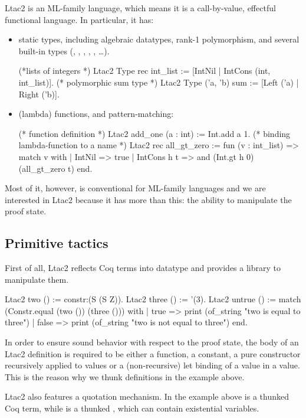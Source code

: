 Ltac2 is an ML-family language, which means it is a call-by-value, effectful functional language.
In particular, it has:
\begin{itemize}
\item static types, including algebraic datatypes, rank-1 polymorphism, and several built-in types (, , , , , \ldots).
  \begin{coq}
  (*lists of integers *)
  Ltac2 Type rec int_list := [IntNil | IntCons (int, int_list)].
  (* polymorphic sum type *)
  Ltac2 Type ('a, 'b) sum := [Left ('a) | Right ('b)].
  \end{coq}
\item (lambda) functions, and pattern-matching:
  \begin{coq}
  (* function definition *)
  Ltac2 add_one (a : int) := Int.add a 1.
  (* binding lambda-function to a name *)
  Ltac2 rec all_gt_zero := fun (v : int_list) =>
    match v with
    | IntNil => true
    | IntCons h t => and (Int.gt h 0) (all_gt_zero t)
    end.
  \end{coq}
\end{itemize}

Most of it, however, is conventional for ML-family languages and  we are interested in Ltac2 because it has more than this: the ability to manipulate the proof state.

\subsection{Primitive tactics}
\label{sec:primitive-tactics}

First of all, Ltac2 reflects Coq terms into  datatype and provides a library to manipulate them.

\begin{coq}
Ltac2 two () := constr:(S (S Z)).
Ltac2 three () := '(3).
Ltac2 untrue () := match (Constr.equal (two ()) (three ())) with
  | true => print (of_string "two is equal to three")
  | false => print (of_string "two is not equal to three")
  end.
\end{coq}

In order to ensure sound behavior with respect to the proof state, the body of an Ltac2 definition is required to be either a function, a constant, a pure constructor recursively applied to values or a (non-recursive) let binding of a value in a value.
This is the reason why we thunk definitions in the example above.

Ltac2 also features a quotation mechanism.
In the example above  is a thunked Coq term, while  is a thunked , which can contain existential variables.

